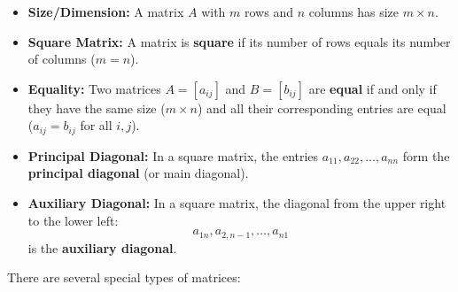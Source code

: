\begin{itemize}
    \item \textbf{Size/Dimension:} A matrix $A$ with $m$ rows and $n$ columns has size $m \times n$.
    \item \textbf{Square Matrix:} A matrix is \textbf{square} if its number of rows equals its number of columns ($m=n$).
    \item \textbf{Equality:} Two matrices $A = [a_{ij}]$ and $B = [b_{ij}]$ are \textbf{equal} if and only if they have the same size ($m \times n$) and all their corresponding entries are equal ($a_{ij} = b_{ij}$ for all $i, j$).
    \item \textbf{Principal Diagonal:} In a square matrix, the entries $a_{11}, a_{22}, \ldots, a_{nn}$ form the \textbf{principal diagonal} (or main diagonal).
    \item \textbf{Auxiliary Diagonal:} In a square matrix, the diagonal from the upper right to the lower left:
    $$a_{1n}, a_{2,n-1}, \ldots, a_{n1}$$ is the \textbf{auxiliary diagonal}.
\end{itemize}

There are several special types of matrices:

% 

